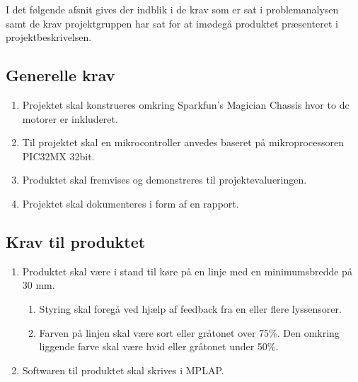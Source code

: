I det følgende afsnit gives der indblik i de krav som er sat i problemanalysen samt de krav projektgruppen har sat for at imødegå produktet præsenteret i projektbeskrivelsen.

\subsection{Generelle krav}  
\begin{enumerate}
\item Projektet skal konstrueres omkring Sparkfun's Magician Chassis hvor to dc motorer er inkluderet.
\item Til projektet skal en mikrocontroller anvedes baseret på mikroprocessoren PIC32MX 32bit.
\item Produktet skal fremvises og demonstreres til projektevalueringen.
\item Projektet skal dokumenteres i form af en rapport.
\end{enumerate}

\subsection{Krav til produktet}
\begin{enumerate}
\item Produktet skal være i stand til køre på en linje med en minimumsbredde på 30 mm. 
\begin{enumerate}
\item Styring skal foregå ved hjælp af feedback fra en eller flere lyssensorer.
\item Farven på linjen skal være sort eller gråtonet over 75\%.  Den omkring liggende farve skal være hvid eller gråtonet under 50\%.
\end{enumerate}
\item Softwaren til produktet skal skrives i MPLAP.
\end{enumerate}
